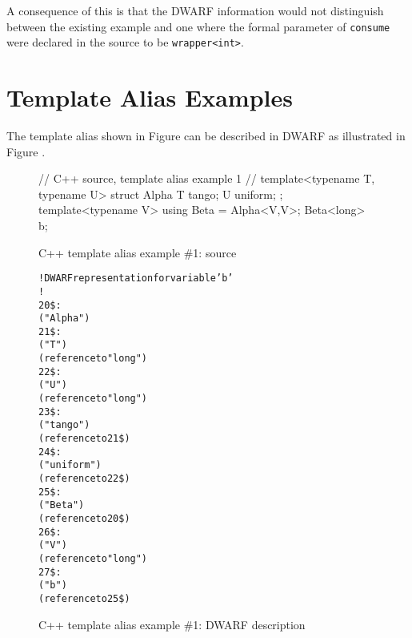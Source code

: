 A consequence of this is that the DWARF information would
not distinguish between the existing example and one where
the formal parameter of \texttt{consume} were declared in the source to be
\texttt{wrapper\textless int\textgreater}.


\section{Template Alias Examples}
\label{app:templatealiasexample}

The  template alias shown in
Figure 
can be described in DWARF as illustrated 
 in 
Figure .

\begin{figure}[ht]
\begin{nlnlisting}
// C++ source, template alias example 1
//
template<typename T, typename U>
struct Alpha {
    T tango;
    U uniform;
};
template<typename V> using Beta = Alpha<V,V>;
Beta<long> b;
\end{nlnlisting}
\caption{C++ template alias example \#1: source}
\label{fig:ctemplatealiasexample1source}
\end{figure}

\clearpage
\begin{figure}[ht]
\begin{dwflisting}
\begin{alltt}
! DWARF representation for variable 'b'
!
20\$:  \DWTAGstructuretype
          \DWATname("Alpha")
21\$:      \DWTAGtemplatetypeparameter
              \DWATname("T")
              \DWATtype(reference to "long")
22\$:      \DWTAGtemplatetypeparameter
              \DWATname("U")
              \DWATtype(reference to "long")
23\$:      \DWTAGmember
              \DWATname("tango")
              \DWATtype(reference to 21\$)
24\$:      \DWTAGmember
              \DWATname("uniform")
              \DWATtype(reference to 22\$)
25\$:  \DWTAGtemplatealias
          \DWATname("Beta")
          \DWATtype(reference to 20\$)
26\$:      \DWTAGtemplatetypeparameter
              \DWATname("V")
              \DWATtype(reference to "long")
27\$:  \DWTAGvariable
          \DWATname("b")
          \DWATtype(reference to 25\$)
\end{alltt}
\end{dwflisting}
\caption{C++ template alias example \#1: DWARF description}
\label{fig:ctemplatealiasexample1dwarf}
\end{figure}

